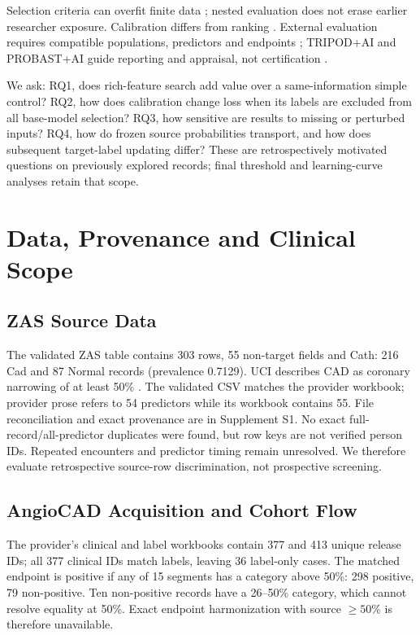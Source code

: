 \documentclass[conference,10pt]{IEEEtran}
\begin{document}
Selection criteria can overfit finite data \cite{r2}; nested evaluation does not erase earlier researcher exposure. Calibration differs from ranking \cite{r5}. External evaluation requires compatible populations, predictors and endpoints \cite{r8,r9}; TRIPOD+AI and PROBAST+AI guide reporting and appraisal, not certification \cite{r6,r7}.

We ask: RQ1, does rich-feature search add value over a same-information simple control? RQ2, how does calibration change loss when its labels are excluded from all base-model selection? RQ3, how sensitive are results to missing or perturbed inputs? RQ4, how do frozen source probabilities transport, and how does subsequent target-label updating differ? These are retrospectively motivated questions on previously explored records; final threshold and learning-curve analyses retain that scope.

\section{Data, Provenance and Clinical Scope}
\subsection{ZAS Source Data}
The validated ZAS table contains 303 rows, 55 non-target fields and Cath: 216 Cad and 87 Normal records (prevalence 0.7129). UCI describes CAD as coronary narrowing of at least 50\% \cite{r3}. The validated CSV matches the provider workbook; provider prose refers to 54 predictors while its workbook contains 55. File reconciliation and exact provenance are in Supplement S1. No exact full-record/all-predictor duplicates were found, but row keys are not verified person IDs. Repeated encounters and predictor timing remain unresolved. We therefore evaluate retrospective source-row discrimination, not prospective screening.

\subsection{AngioCAD Acquisition and Cohort Flow}
The provider's clinical and label workbooks contain 377 and 413 unique release IDs; all 377 clinical IDs match labels, leaving 36 label-only cases. The matched endpoint is positive if any of 15 segments has a category above 50\%: 298 positive, 79 non-positive. Ten non-positive records have a 26--50\% category, which cannot resolve equality at 50\%. Exact endpoint harmonization with source $\geq50\%$ is therefore unavailable.
\end{document}
